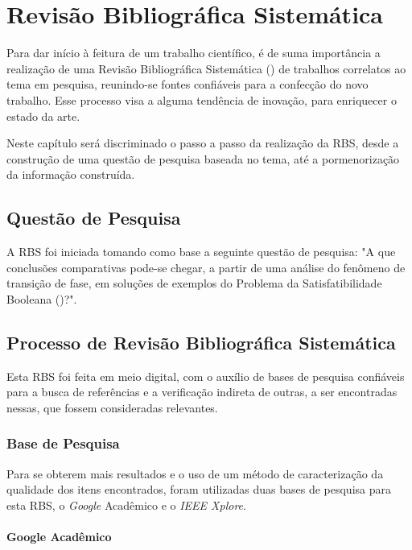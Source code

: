 \chapter{Revisão Bibliográfica Sistemática}

Para dar início à feitura de um trabalho científico, é de suma importância a realização de uma Revisão Bibliográfica Sistemática () de trabalhos correlatos ao tema em pesquisa, reunindo-se fontes confiáveis para a confecção do novo trabalho. Esse processo visa a alguma tendência de inovação, para enriquecer o estado da arte.

Neste capítulo será discriminado o passo a passo da realização da RBS, desde a construção de uma questão de pesquisa baseada no tema, até a pormenorização da informação construída.

\section{Questão de Pesquisa} 

A RBS foi iniciada tomando como base a seguinte questão de pesquisa: "A que conclusões comparativas pode-se chegar, a partir de uma análise do fenômeno de transição de fase, em soluções de exemplos do Problema da Satisfatibilidade Booleana ()?".

\section{Processo de Revisão Bibliográfica Sistemática}

Esta RBS foi feita em meio digital, com o auxílio de bases de pesquisa confiáveis para a busca de referências e a verificação indireta de outras, a ser encontradas nessas, que fossem consideradas relevantes.

\subsection{Base de Pesquisa}

Para se obterem mais resultados e o uso de um método de caracterização da qualidade dos itens encontrados, foram utilizadas duas bases de pesquisa para esta RBS, o \textit{Google} Acadêmico e o \textit{IEEE Xplore}.

\subsubsection{Google Acadêmico}

